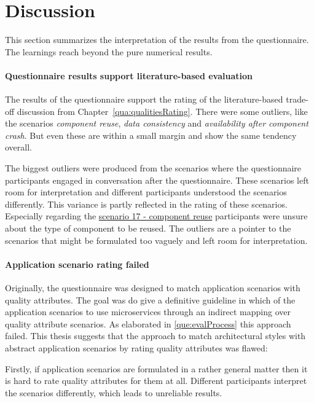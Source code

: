 \clearpage
\section{Discussion}
\label{res:discussion}
This section summarizes the interpretation of the results from the questionnaire.
The learnings reach beyond the pure numerical results.

\paragraph{Questionnaire results support literature-based evaluation}
The results of the questionnaire support the rating of the literature-based trade-off discussion from Chapter~\ref{qua:qualitiesRating}.
There were some outliers, like the scenarios \textit{component reuse}, \textit{data consistency} and \textit{availability after component crash}.
But even these are within a small margin and show the same tendency overall.

The biggest outliers were produced from the scenarios where the questionnaire participants engaged in conversation after the questionnaire. 
These scenarios left room for interpretation and different participants understood the scenarios differently.
This variance is partly reflected in the rating of these scenarios.
Especially regarding the \hyperref[quaMicro:s17]{scenario 17 - component reuse} participants were unsure about the type of component to be reused. 
The outliers are a pointer to the scenarios that might be formulated too vaguely and left room for interpretation. 

\paragraph{Application scenario rating failed}
Originally, the questionnaire was designed to match application scenarios with quality attributes.
The goal was do give a definitive guideline in which of the application scenarios to use microservices through an indirect mapping over quality attribute scenarios.
As elaborated in \ref{que:evalProcess} this approach failed.
This thesis suggests that the approach to match architectural styles with abstract application scenarios by rating quality attributes was flawed:

Firstly, if application scenarios are formulated in a rather general matter then it is hard to rate quality attributes for them at all. 
Different participants interpret the scenarios differently, which leads to unreliable results.

